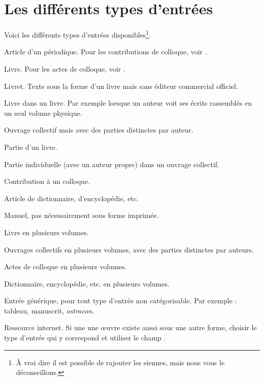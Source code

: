 \section{Les différents types d'entrées}
Voici les différents types d'entrées disponibles\footnote{À vrai dire il est possible de rajouter les siennes, mais nous vous le déconseillons.}.


\begin{choix}

	\item[\type{article}] 
Article d'un périodique. Pour les contributions de colloque, voir .
	\item[\type{book}] 
Livre. Pour les actes de colloque, voir  . 
	\item[\type{booklet}]
	Livret. Texte sous la forme d'un livre mais sans éditeur commercial officiel.
	\item[\type{bookinbook}]
	Livre dans un livre. Par exemple lorsque un auteur  voit ses écrits rassemblés en un seul volume physique. 	
	\item[\type{collection}]
	Ouvrage collectif mais avec des parties distinctes par auteur.
	\item[\type{inbook}]
	Partie d'un livre.
	\item[\type{incollection}]
	Partie individuelle (avec un auteur propre) dans un ouvrage collectif.
	\item[\type{inproceedings}]
	 Contribution à un colloque.
	 \item[\type{inreference}]
	 Article de dictionnaire, d'encyclopédie, etc.
	\item[\type{manual}]
	 Manuel, pas nécessairement sous forme imprimée.
	 \item[\type{mvbook}]
	 Livre en plusieurs volumes.
	 \item[\type{mvcollection}]
	 Ouvrages collectifs en plusieurs volumes, avec des parties distinctes par auteurs.
	 \item[\type{mvproceedings}]
	 Actes de colloque en plusieurs volumes.
	 \item[\type{mvreference}]
	 Dictionnaire, encyclopédie, etc. en plusieurs volumes.
	\item[\type{misc}]
	 Entrée générique, pour tout type d'entrée non catégorisable. Par exemple : tableau, manuscrit, \emph{ostracon}. 
	\item[\type{online}]
	Ressource internet. Si une une œuvre existe aussi sous une autre forme, choisir le type d'entrée qui y correspond et utiliser le champ .

\end{choix}
